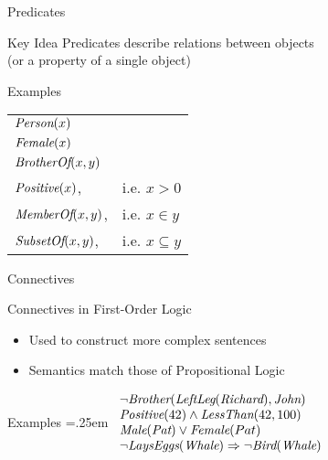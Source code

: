 \documentclass[12pt]{beamer}
\newcommand{\EM}[1]{\mbox{\em#1}}
\newcommand{\tab}{\hspace{1em}}
\newcommand{\limpl}{\Rightarrow}
\begin{document}
\begin{frame}{Predicates}
	\begin{block}{Key Idea}
		\alert{Predicates} describe relations between objects \\
		\tab(or a property of a single object)
	\end{block}
	\begin{block}{Examples}
		\begin{tabular}{ll}
			$\EM{Person}(x)$ \\
			$\EM{Female}(x)$ \\
			$\EM{BrotherOf}(x, y)$ \\
			$\EM{Positive}(x)$,     & i.e. $x > 0$ \\
			$\EM{MemberOf}(x, y)$,  & i.e. $x \in y$ \\
			$\EM{SubsetOf}(x, y)$,  & i.e. $x \subseteq y$ \\
		\end{tabular}
	\end{block}
\end{frame}
\begin{frame}{Connectives}
	\begin{block}{Connectives in First-Order Logic}
		\begin{itemize}
			\item Used to construct more complex sentences
			\item Semantics match those of Propositional Logic
		\end{itemize}
	\end{block}
	\begin{block}{Examples}
		\extrarowheight=.25em 
		$
		\begin{array}{ll}
			\lnot\EM{Brother}(\EM{LeftLeg}(\EM{Richard}), \EM{John}) \\
			\EM{Positive}(42) \land \EM{LessThan}(42, 100) \\
			\EM{Male}(\EM{Pat}) \lor \EM{Female}(Pat) \\
			\lnot\EM{LaysEggs}(\EM{Whale}) \limpl \lnot\EM{Bird}(\EM{Whale})
		\end{array}
		$
	\end{block}
\end{frame}
\end{document}
